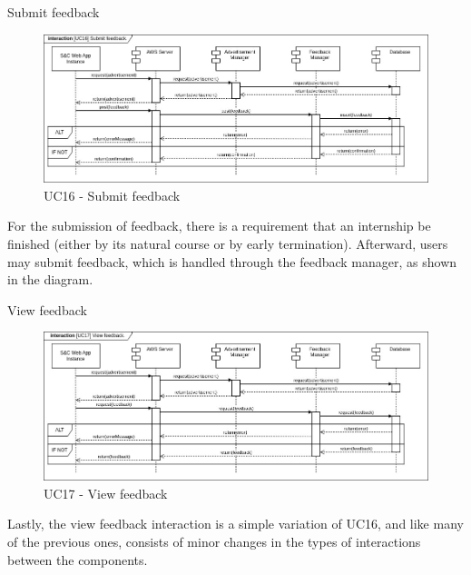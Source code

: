 \begin{enumerate}[label={[UC\arabic*]}]
    \item Submit feedback

    \begin{figure}[h]
        \centering
        \includegraphics[width=1\linewidth]{DD-Latex//assets//Runtime View Diagrams/UC16.jpg}
        \caption{UC16 - Submit feedback}
        \label{fig:UC16}
    \end{figure}

    For the submission of feedback, there is a requirement that an internship be finished (either by its natural course or by early termination). Afterward, users may submit feedback, which is handled through the feedback manager, as shown in the diagram.
    \newpage
    
    \item View feedback

    \begin{figure}[h]
        \centering
        \includegraphics[width=1\linewidth]{DD-Latex//assets//Runtime View Diagrams/UC17.jpg}
        \caption{UC17 - View feedback}
        \label{fig:UC17}
    \end{figure}

    Lastly, the view feedback interaction is a simple variation of UC16, and like many of the previous ones, consists of minor changes in the types of interactions between the components.
\end{enumerate}